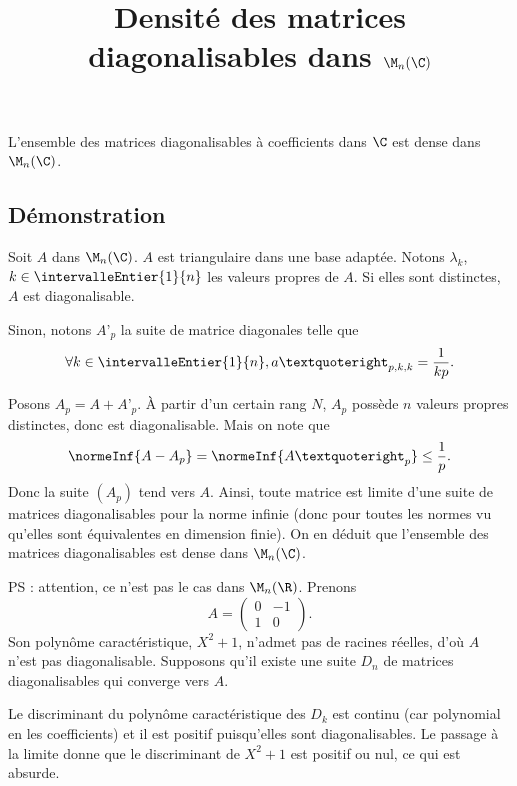 \documentclass[fontsize=12pt,twoside=false,parskip=half, french]{scrartcl}
\title{Densité des matrices diagonalisables dans $\M_n(\C)$}
\date{}
\author{}
\begin{document}
\maketitle
   \begin{Theoreme}
      L’ensemble des matrices diagonalisables à coefficients dans $\C$ est dense
      dans $\M_n(\C)$.
   \end{Theoreme}
   \subsection{Démonstration}
      Soit $A$ dans $\M_n(\C)$. $A$ est triangulaire dans une base adaptée. Notons
      $\lambda_k$, $k \in \intervalleEntier{1}{n}$ les valeurs propres de $A$.
      Si elles sont distinctes, $A$ est diagonalisable.
      
      Sinon, notons $A’_{p}$ la suite de matrice diagonales telle que 
      \[
         \forall k \in \intervalleEntier{1}{n}, a’_{p, k, k} = \frac{1}{kp}.
      \]
      
      Posons $A_p = A + A’_p$. À partir d’un certain rang $N$, $A_p$ possède 
      $n$ valeurs propres distinctes, donc est diagonalisable. Mais on note que
      \[
         \normeInf{A - A_p} = \normeInf{A’_p} \leq \frac{1}{p}. 
      \]
      Donc la suite $(A_p)$ tend vers $A$. Ainsi, toute matrice est limite d’une
      suite de matrices diagonalisables pour la norme infinie (donc pour toutes 
      les normes vu qu’elles sont équivalentes en dimension finie). On en déduit
      que l’ensemble des matrices diagonalisables est dense dans $\M_n(\C)$.
      
      PS : attention, ce n’est pas le cas dans $\M_n(\R)$. Prenons
      \[
         A = \begin{pmatrix} 0 & -1 \\ 1 & 0 \end{pmatrix}. 
      \]
      Son polynôme caractéristique, $X^2 + 1$, n’admet pas de racines réelles, 
      d’où $A$ n’est pas diagonalisable. Supposons qu’il existe une suite $D_n$ 
      de matrices diagonalisables qui converge vers $A$. 
      
      Le discriminant du polynôme caractéristique des $D_k$ est continu (car  
      polynomial en les coefficients) et il est positif puisqu’elles sont 
      diagonalisables. Le passage à la limite donne que le discriminant de 
      $X^2 + 1$ est positif ou nul, ce qui est absurde.
\end{document}
